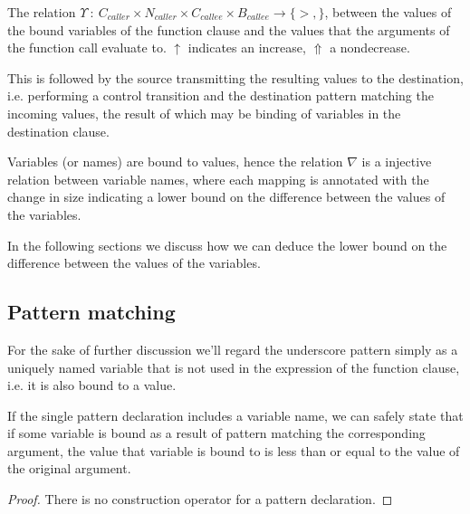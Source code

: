\begin{definition} The relation $\Upsilon\ :\ C_{caller} \times N_{caller} \times C_{callee} \times B_{callee}\rightarrow
\{>,\}$, between the values of the bound variables of the
function clause and the values that the arguments of the function call evaluate
to. $\uparrow$ indicates an increase, $\Uparrow$ a nondecrease.\end{definition}

\begin{lemma}

\end{lemma}
 
This is followed by the source transmitting the resulting values to the
destination, i.e.  performing a control transition and the destination pattern
matching the incoming values, the result of which may be binding of variables
in the destination clause.

Variables (or names) are bound to values, hence the relation $\nabla$ is a
injective relation between variable names, where each mapping is annotated with
the change in size indicating a lower bound on the difference between the
values of the variables.

In the following sections we discuss how we can deduce the lower bound on the
difference between the values of the variables.


\subsection{Pattern matching}

\begin{definition} For the sake of further discussion we'll regard the
underscore pattern simply as a uniquely named variable that is not used in the
expression of the function clause, i.e. it is also bound to a
value.\end{definition}

\begin{lemma}\label{lemma:d-pattern-leq} If the single pattern declaration
includes a variable name, we can safely state that if some variable is bound as
a result of pattern matching the corresponding argument, the value that
variable is bound to is less than or equal to the value of the original
argument. \end{lemma}

\begin{proof} There is no construction operator for a pattern
declaration.\end{proof}

